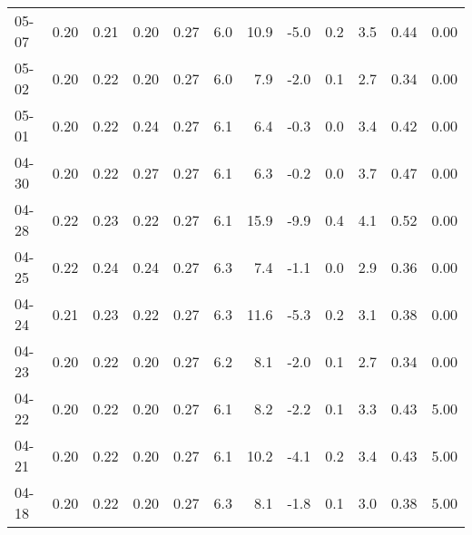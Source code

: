 \begin{threeparttable}
{\begin{tabular}{lrrrrrrrrrrr}
  05-07 &          0.20 &          0.21 &          0.20 &        0.27 &                 6.0 &                10.9 &       -5.0 &                 0.2 &              3.5 &            0.44 &                   0.00 \\
  05-02 &          0.20 &          0.22 &          0.20 &        0.27 &                 6.0 &                 7.9 &       -2.0 &                 0.1 &              2.7 &            0.34 &                   0.00 \\
  05-01 &          0.20 &          0.22 &          0.24 &        0.27 &                 6.1 &                 6.4 &       -0.3 &                 0.0 &              3.4 &            0.42 &                   0.00 \\
  04-30 &          0.20 &          0.22 &          0.27 &        0.27 &                 6.1 &                 6.3 &       -0.2 &                 0.0 &              3.7 &            0.47 &                   0.00 \\
  04-28 &          0.22 &          0.23 &          0.22 &        0.27 &                 6.1 &                15.9 &       -9.9 &                 0.4 &              4.1 &            0.52 &                   0.00 \\
  04-25 &          0.22 &          0.24 &          0.24 &        0.27 &                 6.3 &                 7.4 &       -1.1 &                 0.0 &              2.9 &            0.36 &                   0.00 \\
  04-24 &          0.21 &          0.23 &          0.22 &        0.27 &                 6.3 &                11.6 &       -5.3 &                 0.2 &              3.1 &            0.38 &                   0.00 \\
  04-23 &          0.20 &          0.22 &          0.20 &        0.27 &                 6.2 &                 8.1 &       -2.0 &                 0.1 &              2.7 &            0.34 &                   0.00 \\
  04-22 &          0.20 &          0.22 &          0.20 &        0.27 &                 6.1 &                 8.2 &       -2.2 &                 0.1 &              3.3 &            0.43 &                   5.00 \\
  04-21 &          0.20 &          0.22 &          0.20 &        0.27 &                 6.1 &                10.2 &       -4.1 &                 0.2 &              3.4 &            0.43 &                   5.00 \\
  04-18 &          0.20 &          0.22 &          0.20 &        0.27 &                 6.3 &                 8.1 &       -1.8 &                 0.1 &              3.0 &            0.38 &                   5.00 \\

\end{tabular}}
\end{threeparttable}
